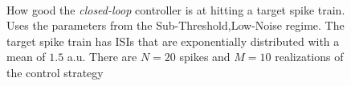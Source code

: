 \documentclass[12pt]{iopart}
\begin{document}
\begin{figure}[htp]
\begin{center}
\\
  \caption[ ]{How good the {\sl closed-loop} controller is at hitting a target
  spike train. Uses the parameters from the Sub-Threshold,Low-Noise regime. The
  target spike train has ISIs that are exponentially distributed with a
  mean of $1.5$ a.u. There are $N=20$ spikes and $M=10$ realizations of the
  control strategy}
  \label{fig:targettrain_cl_lownoise}
\end{center}
\end{figure}
\end{document}
